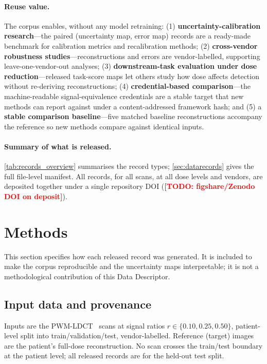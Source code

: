 \documentclass{article}
\newcommand{\todo}[1]{\textcolor{red}{\textbf{[TODO: #1]}}}
\newcommand{\datadoi}{\todo{figshare/Zenodo DOI on deposit}}
\begin{document}
\paragraph{Reuse value.} The corpus enables, without any model retraining:
(1) \textbf{uncertainty-calibration research}---the paired
(uncertainty map, error map) records are a ready-made benchmark for
calibration metrics and recalibration methods; (2) \textbf{cross-vendor
robustness studies}---reconstructions and errors are vendor-labelled,
supporting leave-one-vendor-out analyses; (3) \textbf{downstream-task
evaluation under dose reduction}---released task-score maps let others
study how dose affects detection without re-deriving reconstructions; (4)
\textbf{credential-based comparison}---the machine-readable
signal-equivalence credentials are a stable target that new methods can
report against under a content-addressed framework hash; and (5) a
\textbf{stable comparison baseline}---five matched baseline
reconstructions accompany the reference so new methods compare against
identical inputs.

\paragraph{Summary of what is released.} \autoref{tab:records_overview}
summarises the record types; \autoref{sec:datarecords} gives the full
file-level manifest. All records, for all scans, at all dose levels and
vendors, are deposited together under a single repository DOI
(\datadoi).

\section{Methods}
\label{sec:method}

This section specifies how each released record was generated. It is
included to make the corpus reproducible and the uncertainty maps
interpretable; it is not a methodological contribution of this Data
Descriptor.

\subsection{Input data and provenance}
Inputs are the PWM-LDCT~\citep{ws1dataset} scans at signal ratios $r \in
\{0.10, 0.25, 0.50\}$, patient-level split into train/validation/test,
vendor-labelled. Reference (target) images are the patient's full-dose
reconstruction. No scan crosses the train/test boundary at the patient
level; all released records are for the held-out test split.
\end{document}
